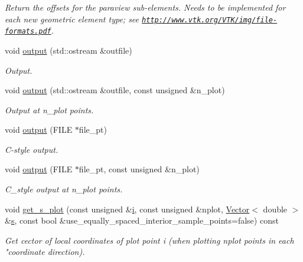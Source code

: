 \begin{DoxyCompactItemize}
\begin{DoxyCompactList}\small\item\em Return the offsets for the paraview sub-\/elements. Needs to be implemented for each new geometric element type; see \href{http://www.vtk.org/VTK/img/file-formats.pdf}{\tt http\+://www.\+vtk.\+org/\+V\+T\+K/img/file-\/formats.\+pdf}. \end{DoxyCompactList}\item 
void \hyperlink{classoomph_1_1QElement_3_013_00_01NNODE__1D_01_4_a9859c393a3b4b4808f315cb1baf8dde4}{output} (std\+::ostream \&outfile)
\begin{DoxyCompactList}\small\item\em Output. \end{DoxyCompactList}\item 
void \hyperlink{classoomph_1_1QElement_3_013_00_01NNODE__1D_01_4_a7023719931a1aa50096f1eeee34d173e}{output} (std\+::ostream \&outfile, const unsigned \&n\+\_\+plot)
\begin{DoxyCompactList}\small\item\em Output at n\+\_\+plot points. \end{DoxyCompactList}\item 
void \hyperlink{classoomph_1_1QElement_3_013_00_01NNODE__1D_01_4_a8fa9ec0d0b74e734fc7d4066145c392b}{output} (F\+I\+LE $\ast$file\+\_\+pt)
\begin{DoxyCompactList}\small\item\em C-\/style output. \end{DoxyCompactList}\item 
void \hyperlink{classoomph_1_1QElement_3_013_00_01NNODE__1D_01_4_a48a7cbdd3fb6baaeed2f009ef4d1985b}{output} (F\+I\+LE $\ast$file\+\_\+pt, const unsigned \&n\+\_\+plot)
\begin{DoxyCompactList}\small\item\em C\+\_\+style output at n\+\_\+plot points. \end{DoxyCompactList}\item 
void \hyperlink{classoomph_1_1QElement_3_013_00_01NNODE__1D_01_4_a428bcc9d0770b42d188eea1323bf66a4}{get\+\_\+s\+\_\+plot} (const unsigned \&\hyperlink{cfortran_8h_adb50e893b86b3e55e751a42eab3cba82}{i}, const unsigned \&nplot, \hyperlink{classoomph_1_1Vector}{Vector}$<$ double $>$ \&\hyperlink{cfortran_8h_ab7123126e4885ef647dd9c6e3807a21c}{s}, const bool \&use\+\_\+equally\+\_\+spaced\+\_\+interior\+\_\+sample\+\_\+points=false) const
\begin{DoxyCompactList}\small\item\em Get cector of local coordinates of plot point i (when plotting nplot points in each "coordinate direction). \end{DoxyCompactList}\item 

\end{DoxyCompactItemize}
